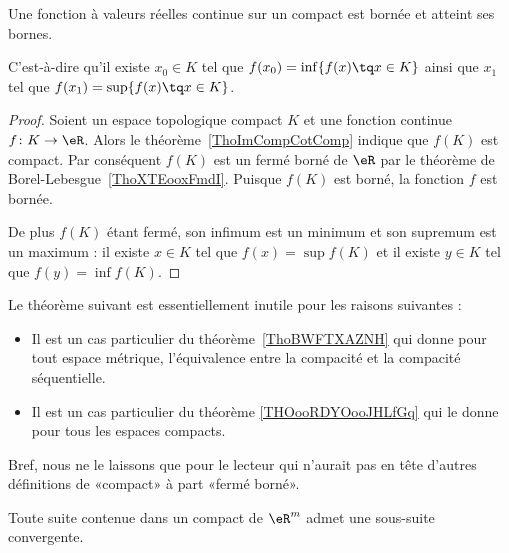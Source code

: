 \begin{theorem}\label{ThoMKKooAbHaro}
	Une fonction à valeurs réelles continue sur un compact est bornée et atteint ses bornes.

	C'est-à-dire qu'il existe \( x_0\in K\) tel que \( f(x_0)=\inf\{ f(x)\tq x\in K \}\) ainsi que \( x_1\) tel que \( f(x_1)=\sup\{ f(x)\tq x\in K \}\).
\end{theorem}

\begin{proof}
	Soient un espace topologique compact \( K\) et une fonction continue \( f\colon K\to \eR\). Alors le théorème~\ref{ThoImCompCotComp} indique que \( f(K)\) est compact. Par conséquent \( f(K)\) est un fermé borné de \( \eR\) par le théorème de Borel-Lebesgue~\ref{ThoXTEooxFmdI}. Puisque \( f(K)\) est borné, la fonction \( f\) est bornée.

	De plus \( f(K)\) étant fermé, son infimum est un minimum et son supremum est un maximum : il existe \( x\in K\) tel que \( f(x)=\sup f(K)\) et il existe \( y\in K\) tel que \( f(y)=\inf f(K)\).
\end{proof}

Le théorème suivant est essentiellement inutile pour les raisons suivantes :
\begin{itemize}
	\item
	      Il est un cas particulier du théorème~\ref{ThoBWFTXAZNH} qui donne pour tout espace métrique, l'équivalence entre la compacité et la compacité séquentielle.
	\item
	      Il est un cas particulier du théorème \ref{THOooRDYOooJHLfGq} qui le donne pour tous les espaces compacts.
\end{itemize}
Bref, nous ne le laissons que pour le lecteur qui n'aurait pas en tête d'autres définitions de «compact» à part «fermé borné».

\begin{theorem}        \label{ThoBolzanoWeierstrassRn}
	Toute suite contenue dans un compact de \( \eR^m\) admet une sous-suite convergente.
\end{theorem}

